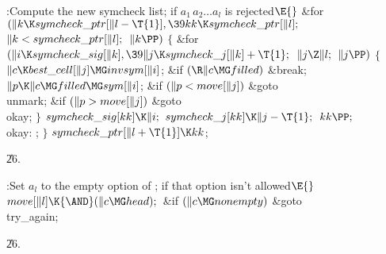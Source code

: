 \B{}:Compute the new symcheck list;  if $a_1\,a_2\ldots a_l$ is rejected\X${}\E{}$\6
\&{for} ${}(\|k\K\\{symcheck\_ptr}[\|l-\T{1}],\39\\{kk}\K\\{symcheck\_ptr}[%
\|l];{}$ ${}\|k<\\{symcheck\_ptr}[\|l];{}$ ${}\|k\PP){}$\5
${}\{{}$\1\6
\&{for} ${}(\|i\K\\{symcheck\_sig}[\|k],\39\|j\K\\{symcheck\_j}[\|k]+\T{1};{}$
${}\|j\Z\|l;{}$ ${}\|j\PP){}$\5
${}\{{}$\1\6
${}\|c\K\\{best\_cell}[\|j]\MG\\{invsym}[\|i]{}$;\6
\&{if} ${}(\R\|c\MG\\{filled}){}$\1\5
\&{break};\2\6
${}\|p\K\|c\MG\\{filled}\MG\\{sym}[\|i]{}$;\6
\&{if} ${}(\|p<\\{move}[\|j]){}$\1\5
\&{goto} \\{unmark};\2\6
\&{if} ${}(\|p>\\{move}[\|j]){}$\1\5
\&{goto} \\{okay};\2\6
\4${}\}{}$\2\6
${}\\{symcheck\_sig}[\\{kk}]\K\|i;{}$\6
${}\\{symcheck\_j}[\\{kk}]\K\|j-\T{1};{}$\6
${}\\{kk}\PP;{}$\6
\4\\{okay}:\5
;\6
\4${}\}{}$\2\6
${}\\{symcheck\_ptr}[\|l+\T{1}]\K\\{kk}{}$;\par
\U26.\fi

\B{}:Set $a_l$ to the empty option of ;  if that option isn't allowed\X${}\E{}$\6
$\\{move}[\|l]\K{\AND}(\|c\MG\\{head});{}$\6
\&{if} ${}(\|c\MG\\{nonempty}){}$\1\5
\&{goto} \\{try\_again};\2\par
\U26.\fi

